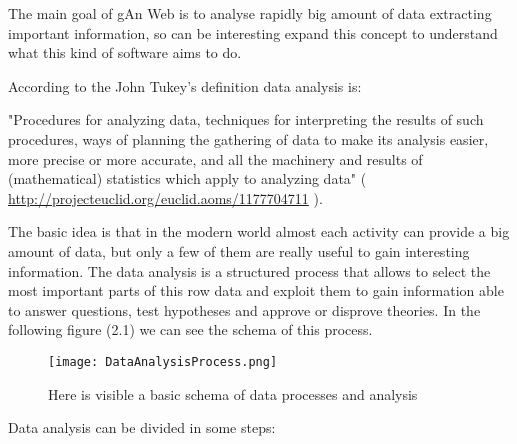 The main goal of gAn Web is to analyse rapidly big amount of data extracting important information, so can be interesting expand this concept to understand what this kind of software aims to do.

According to the John Tukey's definition data analysis is: 

"Procedures for analyzing data, techniques for interpreting the results of such procedures, ways of planning the gathering of data to make its analysis easier, more precise or more accurate, and all the machinery and results of (mathematical) statistics which apply to analyzing data" 
( \url{http://projecteuclid.org/euclid.aoms/1177704711} ).

The basic idea is that in the modern world almost each activity can provide a big amount of data, but only a few of them are really useful to gain interesting information. The data analysis is a structured process that allows to select the most important parts of this row data and exploit them to gain information able to answer questions, test hypotheses and approve or disprove theories.
In the following figure (2.1) we can see the schema of this process. 

\begin{figure}[H]
\centering
\texttt{[image: DataAnalysisProcess.png]} 
\caption{Here is visible a basic schema of data processes and analysis}
\end{figure}

Data analysis can be divided in some steps:


